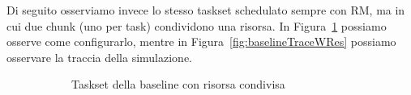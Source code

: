 \myskip

Di seguito osserviamo invece lo stesso taskset schedulato sempre con RM, ma in cui due chunk (uno per task) condividono una risorsa. In Figura~\ref{fig:baselineTasksetWRes} possiamo osserve come configurarlo, mentre in Figura~\ref{fig:baselineTraceWRes} possiamo osservare la traccia della simulazione.

\begin{figure}[htbp]
    \centering
    \begin{subfigure}{0.45\textwidth}
        \vfill
        \centering
        \caption{Taskset della baseline con risorsa condivisa}
        \label{fig:baselineTasksetWRes}
        \vfill
    \end{subfigure}
    \hfill
    \begin{subfigure}{0.45\textwidth}
        \vfill
        \centering

\end{subfigure}
\end{figure}
